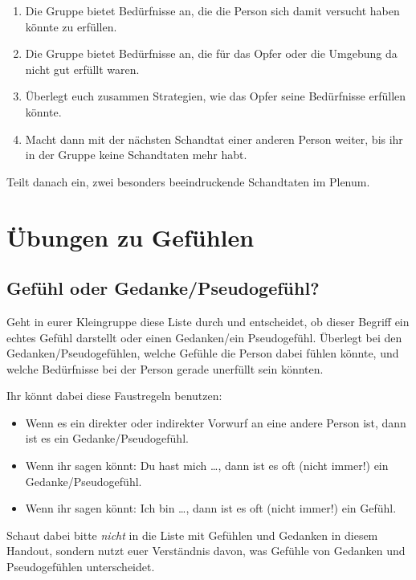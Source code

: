 \begin{enumerate}
    \item Die Gruppe bietet Bedürfnisse an, die die Person sich damit versucht haben könnte zu erfüllen.
    \item Die Gruppe bietet Bedürfnisse an, die für das \glqq Opfer\grqq{} oder die Umgebung da nicht gut erfüllt waren.
    \item Überlegt euch zusammen Strategien, wie das \glqq Opfer\grqq{} seine Bedürfnisse erfüllen könnte.
    \item Macht dann mit der nächsten Schandtat einer anderen Person weiter, bis ihr in der Gruppe keine Schandtaten mehr habt.
\end{enumerate}

Teilt danach ein, zwei besonders beeindruckende Schandtaten im Plenum.


\section{Übungen zu Gefühlen}

\subsection{Gefühl oder Gedanke/Pseudogefühl?}

Geht in eurer Kleingruppe diese Liste durch und entscheidet, ob dieser Begriff ein echtes Gefühl darstellt oder einen Gedanken/ein Pseudogefühl. Überlegt bei den Gedanken/Pseudogefühlen, welche Gefühle die Person dabei fühlen könnte, und welche Bedürfnisse bei der Person gerade unerfüllt sein könnten.

Ihr könnt dabei diese Faustregeln benutzen:

\begin{itemize}
    \item Wenn es ein direkter oder indirekter Vorwurf an eine andere Person ist, dann ist es ein Gedanke/Pseudogefühl.
    \item Wenn ihr sagen könnt: \glqq Du hast mich \ldots\grqq, dann ist es oft (nicht immer!) ein Gedanke/Pseudogefühl.
    \item Wenn ihr sagen könnt: \glqq Ich bin \ldots\grqq, dann ist es oft (nicht immer!) ein Gefühl.
\end{itemize}

Schaut dabei bitte \emph{nicht} in die Liste mit Gefühlen und Gedanken in diesem Handout, sondern nutzt euer Verständnis davon, was Gefühle von Gedanken und Pseudogefühlen unterscheidet.

